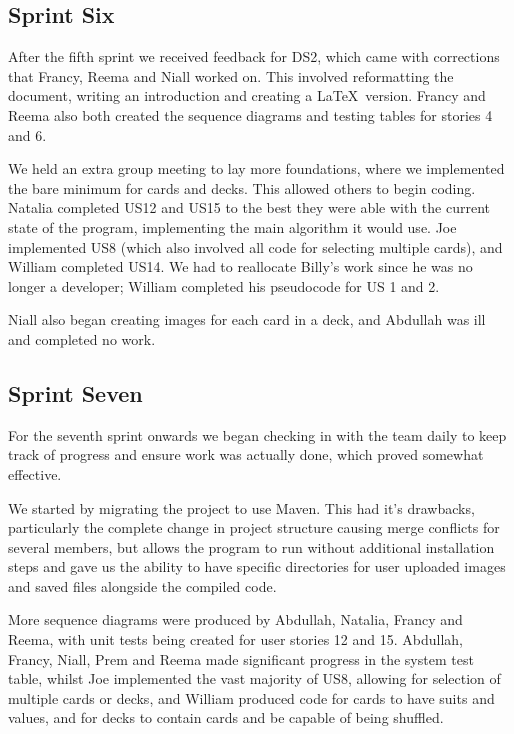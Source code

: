 \documentclass[a4paper]{project}
\begin{document}
		\subsection{Sprint Six}\label{subsec:sprint-six}
			
			After the fifth sprint we received feedback for DS2, which came with corrections that Francy, Reema and Niall worked on. This involved reformatting the document, writing an introduction and creating a \LaTeX\ version. Francy and Reema also both created the sequence diagrams and testing tables for stories 4 and 6.
		
			We held an extra group meeting to lay more foundations, where we implemented the bare minimum for cards and decks. This allowed others to begin coding. Natalia completed US12 and US15 to the best they were able with the current state of the program, implementing the main algorithm it would use. Joe implemented US8 (which also involved all code for selecting multiple cards), and William completed US14. We had to reallocate Billy's work since he was no longer a developer; William completed his pseudocode for US 1 and 2. 
		
			Niall also began creating images for each card in a deck, and Abdullah was ill and completed no work.

		\subsection{Sprint Seven}\label{subsec:sprint-seven}
		
			For the seventh sprint onwards we began checking in with the team daily to keep track of progress and ensure work was actually done, which proved somewhat effective.
			
			We started by migrating the project to use Maven. This had it's drawbacks, particularly the complete change in project structure causing merge conflicts for several members, but allows the program to run without additional installation steps and gave us the ability to have specific directories for user uploaded images and saved files alongside the compiled code.
			
			More sequence diagrams were produced by Abdullah, Natalia, Francy and Reema, with unit tests being created for user stories 12 and 15. Abdullah, Francy, Niall, Prem and Reema made significant progress in the system test table, whilst Joe implemented the vast majority of US8, allowing for selection of multiple cards or decks, and William produced code for cards to have suits and values, and for decks to contain cards and be capable of being shuffled.
			
\end{document}
